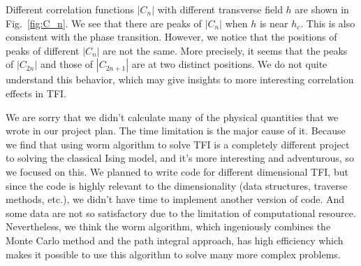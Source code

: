 \documentclass{article}
\theoremstyle{plain} \newtheorem{thm}{Theorem}[section]
\theoremstyle{definition} \newtheorem{df}{Definition}[section]
\theoremstyle{definition} \newtheorem{eg}{Example}
\theoremstyle{remark} \newtheorem*{rmk}{Remark}
\begin{document}
Different correlation functions $|C_n|$ with different transverse field $h$ are shown in Fig.~\ref{fig:C_n}. We see that there are peaks of $|C_n|$ when $h$ is near $h_c$. This is also consistent with the phase transition. However, we notice that the positions of peaks of different $|C_n|$ are not the same. More precisely, it seems that the peaks of $|C_{2n}|$ and those of $|C_{2n+1}|$ are at two distinct positions. We do not quite understand this behavior, which may give insights to more interesting correlation effects in TFI.

We are sorry that we didn't calculate many of the physical quantities that we wrote in our project plan. The time limitation is the major cause of it. Because we find that using worm algorithm to solve TFI is a completely different project to solving the classical Ising model, and it's more interesting and adventurous, so we focused on this. We planned to write code for different dimensional TFI, but since the code is highly relevant to the dimensionality (data structures, traverse methods, etc.), we didn't have time to implement another version of code. And some data are not so satisfactory due to the limitation of computational resource. Nevertheless, we think the worm algorithm, which ingeniously combines the Monte Carlo method and the path integral approach, has high efficiency which makes it possible to use this algorithm to solve many more complex problems.
\end{document}
